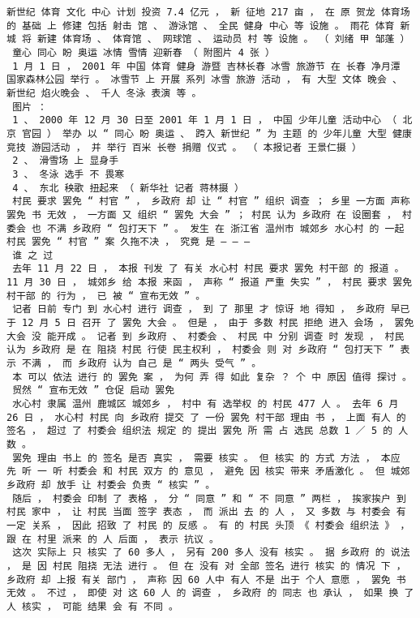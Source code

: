 \documentclass{article}
\begin{document}
\begin{Verbatim}[commandchars=\\\{\}]
 新世纪 体育 文化 中心 计划 投资 7.4 亿元 ， 新 征地 217 亩 ， 在 原 贺龙 体育场 的 基础 上 修建 包括 射击 馆 、 游泳馆 、 全民 健身 中心 等 设施 。 雨花 体育 新城 将 新建 体育场 、 体育馆 、 网球馆 、 运动员 村 等 设施 。 （ 刘绪 甲 邹蓬 ） 
 童心 同心 盼 奥运 冰情 雪情 迎新春 （ 附图片 4 张 ） 
 1 月 1 日 ， 2001 年 中国 体育 健身 游暨 吉林长春 冰雪 旅游节 在 长春 净月潭 国家森林公园 举行 。 冰雪节 上 开展 系列 冰雪 旅游 活动 ， 有 大型 文体 晚会 、 新世纪 焰火晚会 、 千人 冬泳 表演 等 。 
 图片 ： 
 1 、 2000 年 12 月 30 日至 2001 年 1 月 1 日 ， 中国 少年儿童 活动中心 （ 北京 官园 ） 举办 以 “ 同心 盼 奥运 、 跨入 新世纪 ” 为 主题 的 少年儿童 大型 健康 竞技 游园活动 ， 并 举行 百米 长卷 捐赠 仪式 。 （ 本报记者 王景仁摄 ） 
 2 、 滑雪场 上 显身手 
 3 、 冬泳 选手 不 畏寒 
 4 、 东北 秧歌 扭起来 （ 新华社 记者 蒋林摄 ） 
 村民 要求 罢免 “ 村官 ” ， 乡政府 却 让 “ 村官 ” 组织 调查 ； 乡里 一方面 声称 罢免 书 无效 ， 一方面 又 组织 “ 罢免 大会 ” ； 村民 认为 乡政府 在 设圈套 ， 村委会 也 不满 乡政府 “ 包打天下 ” 。 发生 在 浙江省 温州市 城郊乡 水心村 的 一起 村民 罢免 “ 村官 ” 案 久拖不决 ， 究竟 是 — — — 
 谁 之 过 
 去年 11 月 22 日 ， 本报 刊发 了 有关 水心村 村民 要求 罢免 村干部 的 报道 。 11 月 30 日 ， 城郊乡 给 本报 来函 ， 声称 “ 报道 严重 失实 ” ， 村民 要求 罢免 村干部 的 行为 ， 已 被 “ 宣布无效 ” 。 
 记者 日前 专门 到 水心村 进行 调查 ， 到 了 那里 才 惊讶 地 得知 ， 乡政府 早已 于 12 月 5 日 召开 了 罢免 大会 。 但是 ， 由于 多数 村民 拒绝 进入 会场 ， 罢免 大会 没 能开成 。 记者 到 乡政府 、 村委会 、 村民 中 分别 调查 时 发现 ， 村民 认为 乡政府 是 在 阻挠 村民 行使 民主权利 ， 村委会 则 对 乡政府 “ 包打天下 ” 表示 不满 ， 而 乡政府 认为 自己 是 “ 两头 受气 ” 。 
 本 可以 依法 进行 的 罢免 案 ， 为何 弄 得 如此 复杂 ？ 个 中 原因 值得 探讨 。 
 贸然 “ 宣布无效 ” 仓促 启动 罢免 
 水心村 隶属 温州 鹿城区 城郊乡 ， 村中 有 选举权 的 村民 477 人 。 去年 6 月 26 日 ， 水心村 村民 向 乡政府 提交 了 一份 罢免 村干部 理由 书 ， 上面 有人 的 签名 ， 超过 了 村委会 组织法 规定 的 提出 罢免 所 需 占 选民 总数 1 ／ 5 的 人数 。 
 罢免 理由 书上 的 签名 是否 真实 ， 需要 核实 。 但 核实 的 方式 方法 ， 本应 先 听 一 听 村委会 和 村民 双方 的 意见 ， 避免 因 核实 带来 矛盾激化 。 但 城郊 乡政府 却 放手 让 村委会 负责 “ 核实 ” 。 
 随后 ， 村委会 印制 了 表格 ， 分 “ 同意 ” 和 “ 不 同意 ” 两栏 ， 挨家挨户 到 村民 家中 ， 让 村民 当面 签字 表态 ， 而 派出 去 的 人 ， 又 多数 与 村委会 有 一定 关系 ， 因此 招致 了 村民 的 反感 。 有 的 村民 头顶 《 村委会 组织法 》 ， 跟 在 村里 派来 的 人 后面 ， 表示 抗议 。 
 这次 实际上 只 核实 了 60 多人 ， 另有 200 多人 没有 核实 。 据 乡政府 的 说法 ， 是 因 村民 阻挠 无法 进行 。 但 在 没有 对 全部 签名 进行 核实 的 情况 下 ， 乡政府 却 上报 有关 部门 ， 声称 因 60 人中 有人 不是 出于 个人 意愿 ， 罢免 书 无效 。 不过 ， 即使 对 这 60 人 的 调查 ， 乡政府 的 同志 也 承认 ， 如果 换 了 人 核实 ， 可能 结果 会 有 不同 。 

\end{Verbatim}
\end{document}
